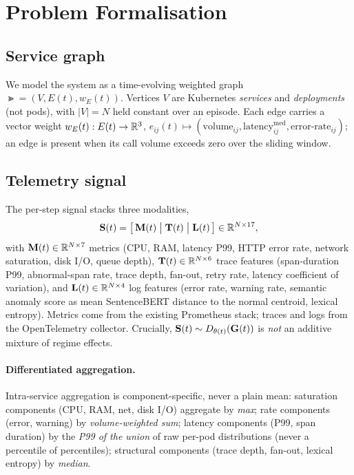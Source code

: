 \section{Problem Formalisation}
\label{sec:formal}

\subsection{Service graph}
We model the system as a time-evolving weighted graph $\Gt=(V,E(t),w_E(t))$. Vertices $V$ are
Kubernetes \emph{services} and \emph{deployments} (not pods), with $|V|=N$ held constant over an
episode. Each edge carries a vector weight $w_E(t):E(t)\to\mathbb{R}^3$,
$e_{ij}(t)\mapsto(\text{volume}_{ij},\text{latency}^{\text{med}}_{ij},\text{error-rate}_{ij})$; an
edge is present when its call volume exceeds zero over the sliding window.

\subsection{Telemetry signal}
The per-step signal stacks three modalities,
\begin{equation}
\mathbf{S}(t)=\big[\,\mathbf{M}(t)\;\big|\;\mathbf{T}(t)\;\big|\;\mathbf{L}(t)\,\big]\in\mathbb{R}^{N\times 17},
\end{equation}
with $\mathbf{M}(t)\in\mathbb{R}^{N\times7}$ metrics (CPU, RAM, latency P99, HTTP error rate, network
saturation, disk I/O, queue depth), $\mathbf{T}(t)\in\mathbb{R}^{N\times6}$ trace features (span-duration
P99, abnormal-span rate, trace depth, fan-out, retry rate, latency coefficient of variation), and
$\mathbf{L}(t)\in\mathbb{R}^{N\times4}$ log features (error rate, warning rate, semantic anomaly score as
mean SentenceBERT distance to the normal centroid, lexical entropy). Metrics come from the
existing Prometheus stack; traces and logs from the OpenTelemetry collector. Crucially,
$\mathbf{S}(t)\sim D_{\theta(t)}(\mathbf{G}(t))$ is \emph{not} an additive mixture of regime effects.

\paragraph{Differentiated aggregation.}
Intra-service aggregation is component-specific, never a plain mean: saturation components (CPU,
RAM, net, disk I/O) aggregate by \emph{max}; rate components (error, warning) by
\emph{volume-weighted sum}; latency components (P99, span duration) by the \emph{P99 of the union}
of raw per-pod distributions (never a percentile of percentiles); structural components (trace
depth, fan-out, lexical entropy) by \emph{median}.

